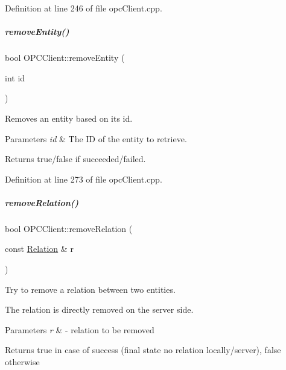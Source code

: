 Definition at line 246 of file opc\+Client.\+cpp.

\mbox{\label{group__icubclient__clients_afcb57495b66f77df3aa4991f2a14901e}} 
\subparagraph{\texorpdfstring{remove\+Entity()}{removeEntity()}\hspace{0.1cm}{\footnotesize\ttfamily [2/2]}}
{\footnotesize\ttfamily bool O\+P\+C\+Client\+::remove\+Entity (\begin{DoxyParamCaption}\item[{int}]{id }\end{DoxyParamCaption})}



Removes an entity based on its id. 


\begin{DoxyParams}{Parameters}
{\em id} & The ID of the entity to retrieve. \\
\hline
\end{DoxyParams}
\begin{DoxyReturn}{Returns}
true/false if succeeded/failed. 
\end{DoxyReturn}


Definition at line 273 of file opc\+Client.\+cpp.

\mbox{\label{group__icubclient__clients_ac28de9ea15a53d29d9e5c794d98d0ab4}} 
\subparagraph{\texorpdfstring{remove\+Relation()}{removeRelation()}\hspace{0.1cm}{\footnotesize\ttfamily [1/2]}}
{\footnotesize\ttfamily bool O\+P\+C\+Client\+::remove\+Relation (\begin{DoxyParamCaption}\item[{const \hyperlink{group__icubclient__representations_classicubclient_1_1Relation}{Relation} \&}]{r }\end{DoxyParamCaption})}



Try to remove a relation between two entities. 

The relation is directly removed on the server side. 
\begin{DoxyParams}{Parameters}
{\em r} & -\/ relation to be removed \\
\hline
\end{DoxyParams}
\begin{DoxyReturn}{Returns}
true in case of success (final state no relation locally/server), false otherwise 
\end{DoxyReturn}


